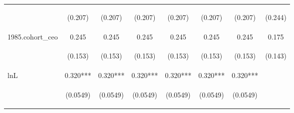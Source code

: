 \begin{center}
\begin{tabular}{lccccccc}
\vspace{4pt} & \begin{footnotesize}(0.207)\end{footnotesize} & \begin{footnotesize}(0.207)\end{footnotesize} & \begin{footnotesize}(0.207)\end{footnotesize} & \begin{footnotesize}(0.207)\end{footnotesize} & \begin{footnotesize}(0.207)\end{footnotesize} & \begin{footnotesize}(0.207)\end{footnotesize} & \begin{footnotesize}(0.244)\end{footnotesize} \\
1985.cohort\_ceo & 0.245 & 0.245 & 0.245 & 0.245 & 0.245 & 0.245 & 0.175 \\
\vspace{4pt} & \begin{footnotesize}(0.153)\end{footnotesize} & \begin{footnotesize}(0.153)\end{footnotesize} & \begin{footnotesize}(0.153)\end{footnotesize} & \begin{footnotesize}(0.153)\end{footnotesize} & \begin{footnotesize}(0.153)\end{footnotesize} & \begin{footnotesize}(0.153)\end{footnotesize} & \begin{footnotesize}(0.143)\end{footnotesize} \\
lnL & 0.320*** & 0.320*** & 0.320*** & 0.320*** & 0.320*** & 0.320*** &  \\
\vspace{4pt} & \begin{footnotesize}(0.0549)\end{footnotesize} & \begin{footnotesize}(0.0549)\end{footnotesize} & \begin{footnotesize}(0.0549)\end{footnotesize} & \begin{footnotesize}(0.0549)\end{footnotesize} & \begin{footnotesize}(0.0549)\end{footnotesize} & \begin{footnotesize}(0.0549)\end{footnotesize} & \begin{footnotesize}\end{footnotesize} \\

\end{tabular}
\end{center}
